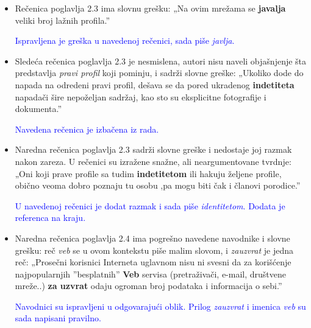 \documentclass[a4paper]{report}
\newcommand{\odgovor}[1]{\textcolor{blue}{#1}}
\begin{document}
\begin{itemize}
    \item Rečenica poglavlja 2.3 ima slovnu grešku: \newline
    „Na ovim mrežama se \textbf{javalja} veliki broj lažnih profila.”
    
    \odgovor{Ispravljena je greška u navedenoj rečenici, sada piše \textit{javlja}.}
    
\end{itemize}
\begin{itemize}
    \item Sledeća rečenica poglavlja 2.3 je nesmislena, autori nisu naveli objašnjenje šta predstavlja \textit{pravi profil} koji pominju, i sadrži slovne greške:\newline
    „Ukoliko dode do napada na odredeni pravi profil, dešava se da pored ukradenog \textbf{indetiteta} napadači šire nepoželjan sadržaj, kao sto su eksplicitne fotografije i dokumenta.”
    
    \odgovor{Navedena rečenica je izbačena iz rada.}
    
\end{itemize}
\begin{itemize}
    \item Naredna rečenica poglavlja 2.3 sadrži slovne greške i nedostaje joj razmak nakon zareza. U rečenici su izražene snažne, ali neargumentovane tvrdnje: \newline
    „Oni koji prave profile sa tudim \textbf{indetitetom} ili hakuju željene profile, obično veoma dobro poznaju tu osobu ,pa mogu biti čak i članovi porodice.”
    
    \odgovor{U navedenoj rečenici je dodat razmak i sada piše \textit{identitetom}. Dodata je referenca na kraju.}
    
\end{itemize}
\begin{itemize}
    \item Naredna rečenica poglavlja 2.4 ima pogrešno navedene navodnike i slovne grešku: reč  \textit{veb} se u ovom kontekstu piše malim slovom, i \textit{zauzvrat} je jedna reč: \newline
    „Prosečni korisnici Interneta uglavnom nisu ni svesni da za korišćenje najpopularnjih ”besplatnih” \textbf{Veb} servisa (pretraživači, e-mail, društvene mreže..) \textbf{za uzvrat} odaju ogroman broj podataka i informacija o sebi.”
    
    \odgovor{Navodnici su ispravljeni u odgovarajući oblik. Prilog \textit{zauzvrat} i imenica \textit{veb} su sada napisani pravilno.}
        
\end{itemize}
\end{document}

